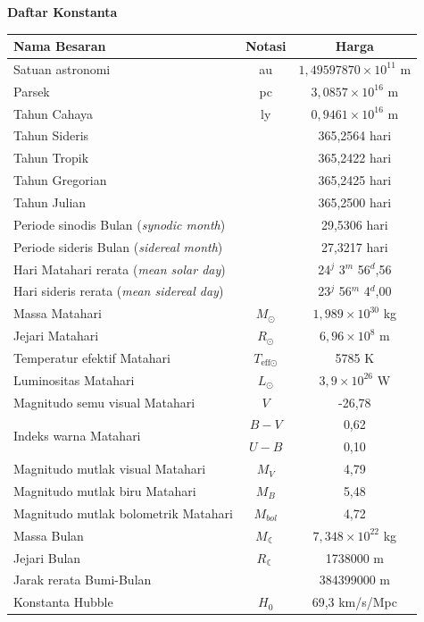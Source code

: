 \documentclass[11pt,fleqn, a4paper]{exam}
\begin{document}
\newpage
\center \LARGE \textbf{Daftar Konstanta}

\begin{table}[ht]
\centering
\label{tab:konstanta01}
\renewcommand{\arraystretch}{1.3}
\begin{tabular}{|l|c|c|}
\hline
\textbf{Nama Besaran} & \textbf{Notasi} & \textbf{Harga}\\
\hline
\hline
Satuan astronomi & au & $1,49597870 \times 10^{11}$ m\\
\hline
Parsek & pc & $3,0857 \times 10^{16}$ m\\
\hline
Tahun Cahaya & ly & $0,9461 \times 10^{16}$ m\\
\hline
Tahun Sideris &  & 365,2564 hari\\
\hline
Tahun Tropik &  & 365,2422 hari\\
\hline
Tahun Gregorian &  & 365,2425 hari\\
\hline
Tahun Julian &  & 365,2500 hari\\
\hline
Periode sinodis Bulan (\textit{synodic month}) &  & 29,5306 hari\\
\hline
Periode sideris Bulan (\textit{sidereal month}) &  & 27,3217 hari\\
\hline
Hari Matahari rerata (\textit{mean solar day}) &  & 24$^{j}$ 3$^{m}$ 56$^{d}$,56\\
\hline
Hari sideris rerata (\textit{mean sidereal day}) &  & 23$^{j}$ 56$^{m}$ 4$^{d}$,00\\
\hline
Massa Matahari & $M_{\odot}$ & $1,989 \times 10^{30}$ kg\\
\hline
Jejari Matahari & $R_{\odot}$ & $6,96 \times 10^{8}$ m\\
\hline
Temperatur efektif Matahari & $T_{\text{eff} \odot}$ & 5785 K\\
\hline
Luminositas Matahari & $L_{\odot}$ & $3,9 \times 10^{26}$ W\\
\hline
Magnitudo semu visual Matahari & $V$ & -26,78\\
\hline
\multirow{2}{*}{Indeks warna Matahari} & $B - V$ & 0,62\\ \cline{2-3}
                                       & $U - B$ & 0,10\\
\hline
Magnitudo mutlak visual Matahari & $M_{V}$ & 4,79\\
\hline
Magnitudo mutlak biru Matahari & $M_{B}$ & 5,48\\
\hline
Magnitudo mutlak bolometrik Matahari & $M_{bol}$ & 4,72\\
\hline
Massa Bulan & $M_{\leftmoon}$ & $7,348 \times 10^{22}$ kg\\
\hline
Jejari Bulan & $R_{\leftmoon}$ & 1738000 m\\
\hline
Jarak rerata Bumi-Bulan & & 384399000 m\\
\hline
Konstanta Hubble & $H_{0}$ & 69,3 km/s/Mpc\\
\hline
\end{tabular} 
\end{table}
\end{document}
